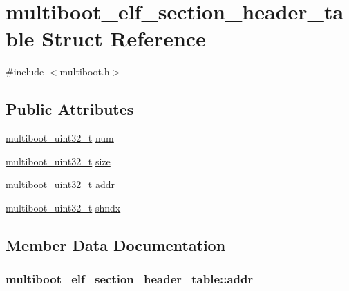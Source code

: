 \hypertarget{structmultiboot__elf__section__header__table}{}\section{multiboot\+\_\+elf\+\_\+section\+\_\+header\+\_\+table Struct Reference}
\label{structmultiboot__elf__section__header__table}


{\ttfamily \#include $<$multiboot.\+h$>$}

\subsection*{Public Attributes}
\begin{DoxyCompactItemize}
\item 
\hyperlink{multiboot_8h_a009f355da41fed4badb8a52d432f5186}{multiboot\+\_\+uint32\+\_\+t} \hyperlink{structmultiboot__elf__section__header__table_ac7a3ee82a45af6c3c10413de7620eec2}{num}
\item 
\hyperlink{multiboot_8h_a009f355da41fed4badb8a52d432f5186}{multiboot\+\_\+uint32\+\_\+t} \hyperlink{structmultiboot__elf__section__header__table_a87bed62f532b2e2e73ab41df40069e2a}{size}
\item 
\hyperlink{multiboot_8h_a009f355da41fed4badb8a52d432f5186}{multiboot\+\_\+uint32\+\_\+t} \hyperlink{structmultiboot__elf__section__header__table_ad0c7bb0937470de83f3319015416614a}{addr}
\item 
\hyperlink{multiboot_8h_a009f355da41fed4badb8a52d432f5186}{multiboot\+\_\+uint32\+\_\+t} \hyperlink{structmultiboot__elf__section__header__table_adfc74c974ba232064320ba57a02d0fb3}{shndx}
\end{DoxyCompactItemize}


\subsection{Member Data Documentation}
\hypertarget{structmultiboot__elf__section__header__table_ad0c7bb0937470de83f3319015416614a}{}
\subsubsection[{addr}]{ multiboot\+\_\+elf\+\_\+section\+\_\+header\+\_\+table\+::addr}\label{structmultiboot__elf__section__header__table_ad0c7bb0937470de83f3319015416614a}
\hypertarget{structmultiboot__elf__section__header__table_ac7a3ee82a45af6c3c10413de7620eec2}{}
